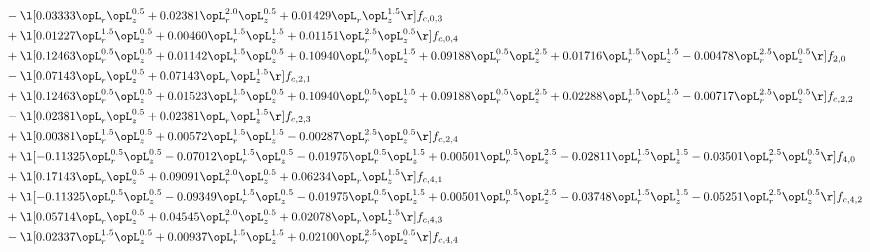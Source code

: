 \begin{alignat}{2}
& - \l[  0.03333 \opL_r \opL_z^{0.5} +  0.02381 \opL_r^{2.0} \opL_z^{0.5} +  0.01429 \opL_r \opL_z^{1.5}  \r] f_{c,0,3} \nonumber \\ 
& + \l[  0.01227 \opL_r^{1.5} \opL_z^{0.5} +  0.00460 \opL_r^{1.5} \opL_z^{1.5} +  0.01151 \opL_r^{2.5} \opL_z^{0.5}  \r] f_{c,0,4} \nonumber \\ 
& + \l[  0.12463 \opL_r^{0.5} \opL_z^{0.5} +  0.01142 \opL_r^{1.5} \opL_z^{0.5} +  0.10940 \opL_r^{0.5} \opL_z^{1.5} +  0.09188 \opL_r^{0.5} \opL_z^{2.5} +  0.01716 \opL_r^{1.5} \opL_z^{1.5}   -0.00478 \opL_r^{2.5} \opL_z^{0.5}  \r] f_{2,0} \nonumber \\ 
& - \l[  0.07143 \opL_r \opL_z^{0.5} +  0.07143 \opL_r \opL_z^{1.5}  \r] f_{c,2,1} \nonumber \\ 
& + \l[  0.12463 \opL_r^{0.5} \opL_z^{0.5} +  0.01523 \opL_r^{1.5} \opL_z^{0.5} +  0.10940 \opL_r^{0.5} \opL_z^{1.5} +  0.09188 \opL_r^{0.5} \opL_z^{2.5} +  0.02288 \opL_r^{1.5} \opL_z^{1.5}   -0.00717 \opL_r^{2.5} \opL_z^{0.5}  \r] f_{c,2,2} \nonumber \\ 
& - \l[  0.02381 \opL_r \opL_z^{0.5} +  0.02381 \opL_r \opL_z^{1.5}  \r] f_{c,2,3} \nonumber \\ 
& + \l[  0.00381 \opL_r^{1.5} \opL_z^{0.5} +  0.00572 \opL_r^{1.5} \opL_z^{1.5}   -0.00287 \opL_r^{2.5} \opL_z^{0.5}  \r] f_{c,2,4} \nonumber \\ 
& + \l[  -0.11325 \opL_r^{0.5} \opL_z^{0.5}   -0.07012 \opL_r^{1.5} \opL_z^{0.5}   -0.01975 \opL_r^{0.5} \opL_z^{1.5} +  0.00501 \opL_r^{0.5} \opL_z^{2.5}   -0.02811 \opL_r^{1.5} \opL_z^{1.5}   -0.03501 \opL_r^{2.5} \opL_z^{0.5}  \r] f_{4,0} \nonumber \\ 
& + \l[  0.17143 \opL_r \opL_z^{0.5} +  0.09091 \opL_r^{2.0} \opL_z^{0.5} +  0.06234 \opL_r \opL_z^{1.5}  \r] f_{c,4,1} \nonumber \\ 
& + \l[  -0.11325 \opL_r^{0.5} \opL_z^{0.5}   -0.09349 \opL_r^{1.5} \opL_z^{0.5}   -0.01975 \opL_r^{0.5} \opL_z^{1.5} +  0.00501 \opL_r^{0.5} \opL_z^{2.5}   -0.03748 \opL_r^{1.5} \opL_z^{1.5}   -0.05251 \opL_r^{2.5} \opL_z^{0.5}  \r] f_{c,4,2} \nonumber \\ 
& + \l[  0.05714 \opL_r \opL_z^{0.5} +  0.04545 \opL_r^{2.0} \opL_z^{0.5} +  0.02078 \opL_r \opL_z^{1.5}  \r] f_{c,4,3} \nonumber \\ 
& - \l[  0.02337 \opL_r^{1.5} \opL_z^{0.5} +  0.00937 \opL_r^{1.5} \opL_z^{1.5} +  0.02100 \opL_r^{2.5} \opL_z^{0.5}  \r] f_{c,4,4} \nonumber \\ 
\end{alignat} 


